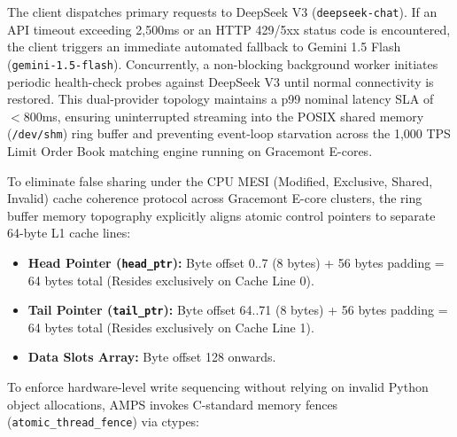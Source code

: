 The client dispatches primary requests to DeepSeek V3 (\texttt{deepseek-chat}). If an API timeout exceeding 2,500ms or an HTTP 429/5xx status code is encountered, the client triggers an immediate automated fallback to Gemini 1.5 Flash (\texttt{gemini-1.5-flash}). Concurrently, a non-blocking background worker initiates periodic health-check probes against DeepSeek V3 until normal connectivity is restored. This dual-provider topology maintains a p99 nominal latency SLA of $< 800$ms, ensuring uninterrupted streaming into the POSIX shared memory (\texttt{/dev/shm}) ring buffer and preventing event-loop starvation across the 1,000 TPS Limit Order Book matching engine running on Gracemont E-cores.

To eliminate false sharing under the CPU MESI (Modified, Exclusive, Shared, Invalid) cache coherence protocol across Gracemont E-core clusters, the ring buffer memory topography explicitly aligns atomic control pointers to separate 64-byte L1 cache lines:
\begin{itemize}
    \item \textbf{Head Pointer (\texttt{head\_ptr}):} Byte offset 0..7 (8 bytes) + 56 bytes padding = 64 bytes total (Resides exclusively on Cache Line 0).
    \item \textbf{Tail Pointer (\texttt{tail\_ptr}):} Byte offset 64..71 (8 bytes) + 56 bytes padding = 64 bytes total (Resides exclusively on Cache Line 1).
    \item \textbf{Data Slots Array:} Byte offset 128 onwards.
\end{itemize}

To enforce hardware-level write sequencing without relying on invalid Python object allocations, AMPS invokes C-standard memory fences (\texttt{atomic\_thread\_fence}) via ctypes:

